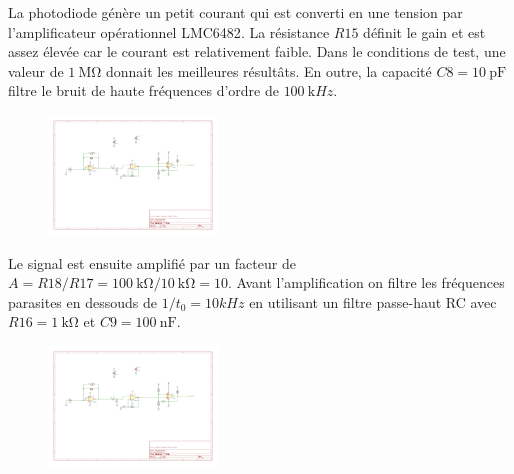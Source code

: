 \documentclass[french]{layout/Report}
\begin{document}
\begin{description}[leftmargin=!,labelwidth=3cm, labelindent=\parindent]
	\item[Convertisseur]
		La photodiode génère un petit courant qui est converti en une tension par l'amplificateur opérationnel LMC6482\cite{LMC6482}.
		La résistance $\mathit{R15}$ définit le gain et est assez élevée car le courant est relativement faible.
		Dans le conditions de test, une valeur de $\SI{1}{\mega\ohm}$ donnait les meilleures résultâts.
		En outre, la capacité $\mathit{C8} = \SI{10}{\pico\farad}$ filtre le bruit de haute fréquences d'ordre de $\SI{100}{\kilo Hz}$.

		\begin{figure}[H]
			\centering
			\includegraphics[width=0.4\textwidth]{fig/current_to_voltage_converter.pdf}
		\end{figure}

	\item[Amplificateur]
        Le signal est ensuite amplifié par un facteur de $A = \mathit{R18}/\mathit{R17} = \SI{100}{\kilo\ohm}/\SI{10}{\kilo\ohm} = 10$.
        Avant l'amplification on filtre les fréquences parasites en dessouds de $1/t_0 = 10kHz$ en utilisant un filtre passe-haut RC avec $\mathit{R16} = \SI{1}{\kilo\ohm}$ et $\mathit{C9} = \SI{100}{\nano\farad}$.

		\begin{figure}[H]
			\centering
			\includegraphics[width=0.4\textwidth]{fig/amplifier.pdf}
		\end{figure}


\end{description}
\end{document}
